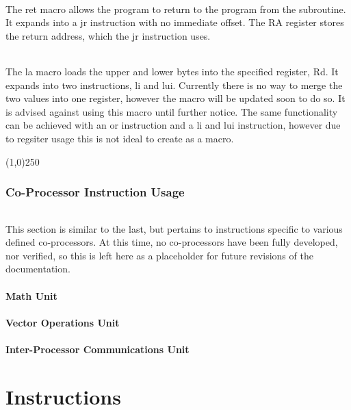\documentclass[letterpaper, 11pt]{article}
\begin{document}
\paragraph{} The ret macro allows the program to return to the program from the subroutine. It expands into a jr instruction
with no immediate offset. The RA register stores the return address, which the jr instruction uses. 

\paragraph{} The la macro loads the upper and lower bytes into the specified register, Rd. It expands into two instructions,
li and lui. Currently there is no way to merge the two values into one register, however the macro will be updated soon to do so.
It is advised against using this macro until further notice. The same functionality can be achieved with an or instruction and
a li and lui instruction, however due to regsiter usage this is not ideal to create as a macro.
\begin{center}
	\line(1,0){250}
\end{center}

\clearpage
\section{Co-Processor Instruction Usage}
\paragraph{}This section is similar to the last, but pertains to instructions specific to various defined co-processors. At this time,
no co-processors have been fully developed, nor verified, so this is left here as a placeholder for future revisions of the documentation.
\subsection{Math Unit}
\subsection{Vector Operations Unit}
\subsection{Inter-Processor Communications Unit}
\clearpage

\part{Instructions}
\end{document}
